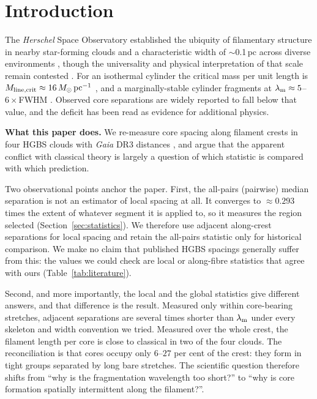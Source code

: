 \documentclass[usenatbib,twoside,twocolumn]{mnras}
\begin{document}
\section{Introduction}

The \textit{Herschel} Space Observatory established the ubiquity of filamentary structure in nearby star-forming clouds \citep{Andre2010} and a characteristic width of $\sim$0.1\,pc across diverse environments \citep{Arzoumanian2011}, though the universality and physical interpretation of that scale remain contested \citep{Panopoulou2017,Panopoulou2022}. For an isothermal cylinder the critical mass per unit length is $M_{\rm line,crit}\approx16\,M_\odot\,{\rm pc^{-1}}$ \citep{Ostriker1964}, and a marginally-stable cylinder fragments at $\lambda_{\rm m}\approx5$--$6\times$FWHM \citep{Inutsuka1992,Fischera2012}. Observed core separations are widely reported to fall below that value, and the deficit has been read as evidence for additional physics.

\smallskip\noindent\textbf{What this paper does.} We re-measure core spacing along filament crests in four HGBS clouds with \textit{Gaia} DR3 distances \citep{Zhang2023}, and argue that the apparent conflict with classical theory is largely a question of which statistic is compared with which prediction.

Two observational points anchor the paper. First, the all-pairs (pairwise) median separation is not an estimator of local spacing at all. It converges to $\approx0.293$ times the extent of whatever segment it is applied to, so it measures the region selected (Section~\ref{sec:statistics}). We therefore use adjacent along-crest separations for local spacing and retain the all-pairs statistic only for historical comparison. We make no claim that published HGBS spacings generally suffer from this: the values we could check are local or along-fibre statistics that agree with ours (Table~\ref{tab:literature}).

Second, and more importantly, the local and the global statistics give different answers, and that difference is the result. Measured only within core-bearing stretches, adjacent separations are several times shorter than $\lambda_{\rm m}$ under every skeleton and width convention we tried. Measured over the whole crest, the filament length per core is close to classical in two of the four clouds. The reconciliation is that cores occupy only $6$--$27$ per cent of the crest: they form in tight groups separated by long bare stretches. The scientific question therefore shifts from ``why is the fragmentation wavelength too short?'' to ``why is core formation spatially intermittent along the filament?''.
\end{document}
